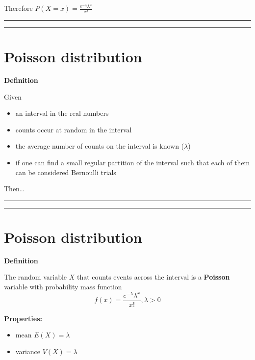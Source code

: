 \documentclass[
]{book}
\providecommand{\tightlist}{%
  \setlength{\itemsep}{0pt}\setlength{\parskip}{0pt}}
\begin{document}
Therefore
\(P(X=x)= \frac{e^{-\lambda}\lambda^x}{x!}\)

\begin{center}\rule{0.5\linewidth}{0.5pt}\end{center}

\begin{center}\rule{0.5\linewidth}{0.5pt}\end{center}

\hypertarget{poisson-distribution-2}{%
\section{Poisson distribution}\label{poisson-distribution-2}}

\textbf{Definition}

Given

\begin{itemize}
\tightlist
\item
  an interval in the real numbers
\item
  counts occur at random in the interval
\item
  the average number of counts on the interval is known (\(\lambda\))
\item
  if one can find a small regular partition of the interval such that each of them can be considered Bernoulli trials
\end{itemize}

Then\ldots{}

\begin{center}\rule{0.5\linewidth}{0.5pt}\end{center}

\begin{center}\rule{0.5\linewidth}{0.5pt}\end{center}

\hypertarget{poisson-distribution-3}{%
\section{Poisson distribution}\label{poisson-distribution-3}}

\textbf{Definition}

The random variable \(X\) that counts events across the interval is a \textbf{Poisson} variable with probability mass function\\
\[f(x)= \frac{e^{-\lambda}\lambda^x}{x!}, \lambda>0\]

\textbf{Properties:}

\begin{itemize}
\tightlist
\item
  mean \(E(X)= \lambda\)
\item
  variance \(V(X)= \lambda\)
\end{itemize}
\end{document}

